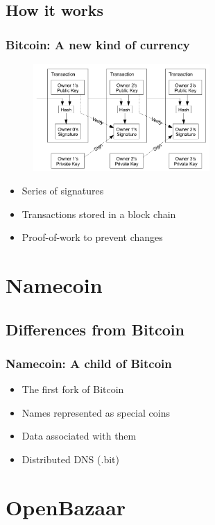 \documentclass{beamer}
\begin{document}
\subsection{How it works}
\begin{frame}
\frametitle{Bitcoin: A new kind of currency}
\begin{figure}[H]
\includegraphics[width=0.6\textwidth]{screenshots/bitcoin.png}
\end{figure}
\begin{itemize}
\item Series of signatures \pause
\item Transactions stored in a block chain
\item Proof-of-work to prevent changes
\end{itemize}
\end{frame}
\section{Namecoin}
\subsection{Differences from Bitcoin}
\begin{frame}
\frametitle{Namecoin: A child of Bitcoin}
\begin{itemize}
\item The first fork of Bitcoin \pause
\item Names represented as special coins
\item Data associated with them \pause
\item Distributed DNS (.bit)
\end{itemize}
\end{frame}
\section{OpenBazaar}
\end{document}
